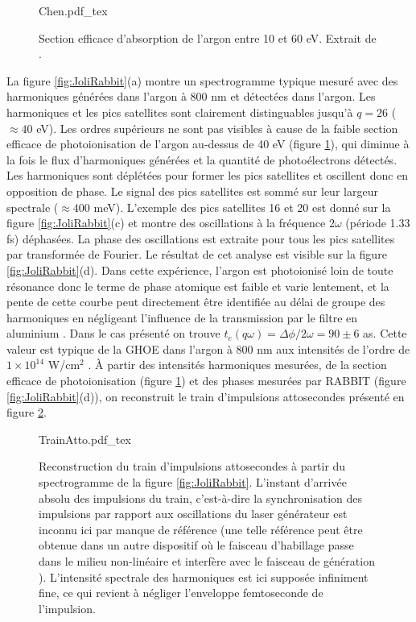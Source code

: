 \begin{figure}
\centering
\def\svgwidth{0.6\columnwidth}
{Chen.pdf_tex}
\caption{Section efficace d'absorption de l'argon entre 10 et 60 eV. Extrait de .}
\label{fig:ChenAr}
\end{figure}

La figure \ref{fig:JoliRabbit}(a) montre un spectrogramme typique mesuré avec des harmoniques générées dans l'argon à 800 nm et détectées dans l'argon. Les harmoniques et les pics satellites sont clairement distinguables jusqu'à $q = 26$ ($\approx 40$ eV). Les ordres supérieurs ne sont pas visibles à cause de la faible section efficace de photoionisation de l'argon au-dessus de 40 eV (figure \ref{fig:ChenAr}), qui diminue à la fois le flux d'harmoniques générées et la quantité de photoélectrons détectés. Les harmoniques sont déplétées pour former les pics satellites et oscillent donc en opposition de phase. Le signal des pics satellites est sommé sur leur largeur spectrale ($\approx 400$ meV). L'exemple des pics satellites 16 et 20 est donné sur la figure \ref{fig:JoliRabbit}(c) et montre des oscillations à la fréquence $2 \omega$ (période 1.33 fs) déphasées. La phase des oscillations est extraite pour tous les pics satellites par transformée de Fourier. Le résultat de cet analyse est visible sur la figure \ref{fig:JoliRabbit}(d). Dans cette expérience, l'argon est photoionisé loin de toute résonance donc le terme de phase atomique est faible et varie lentement, et la pente de cette courbe peut directement être identifiée au délai de groupe des harmoniques en négligeant l'influence de la transmission par le filtre en aluminium . Dans le cas présenté on trouve $t_e (q\omega) = \Delta \phi / 2\omega = 90 \pm 6$ as. Cette valeur est typique de la GHOE dans l'argon à 800 nm aux intensités de l'ordre de $1 \times 10^{14}$ W/cm$^2$ . \`{A} partir des intensités harmoniques mesurées, de la section efficace de photoionisation (figure \ref{fig:ChenAr}) et des phases mesurées par RABBIT (figure \ref{fig:JoliRabbit}(d)), on reconstruit le train d'impulsions attosecondes présenté en figure \ref{fig:TrainAtto}.

\begin{figure}
\centering
\def\svgwidth{0.5\columnwidth}
{TrainAtto.pdf_tex}
\caption{Reconstruction du train d'impulsions attosecondes à partir du spectrogramme de la figure \ref{fig:JoliRabbit}. L'instant d'arrivée absolu des impulsions du train, c'est-à-dire la synchronisation des impulsions par rapport aux oscillations du laser générateur est inconnu ici par manque de référence (une telle référence peut être obtenue dans un autre dispositif où le faisceau d'habillage passe dans le milieu non-linéaire et interfère avec le faisceau de génération ). L'intensité spectrale des harmoniques est ici supposée infiniment fine, ce qui revient à négliger l'enveloppe femtoseconde de l'impulsion.}
\label{fig:TrainAtto}
\end{figure}

